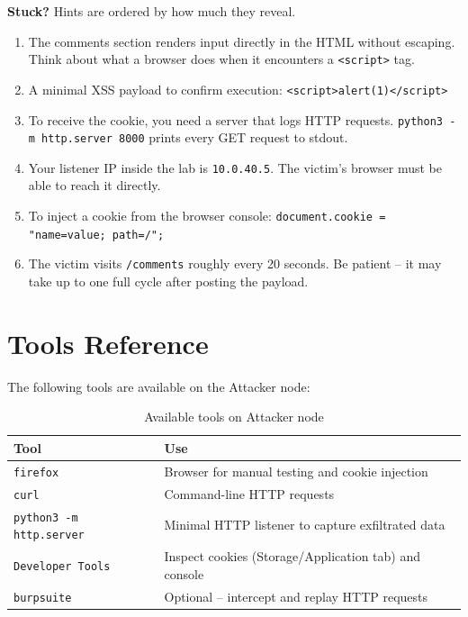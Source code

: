 \documentclass[a4paper, 12pt]{article}
\begin{document}
\begin{mdframed}[backgroundcolor=labgray, linecolor=labred, linewidth=0.5pt]
\textbf{Stuck?} Hints are ordered by how much they reveal.
\begin{enumerate}[leftmargin=2em, topsep=4pt]
    \item The comments section renders input directly in the HTML without escaping.
          Think about what a browser does when it encounters a \texttt{<script>} tag.
    \item A minimal XSS payload to confirm execution:
          \texttt{<script>alert(1)</script>}
    \item To receive the cookie, you need a server that logs HTTP requests.
          \texttt{python3 -m http.server 8000} prints every GET request to stdout.
    \item Your listener IP inside the lab is \texttt{10.0.40.5}.
          The victim's browser must be able to reach it directly.
    \item To inject a cookie from the browser console:
          \texttt{document.cookie = "name=value; path=/";}
    \item The victim visits \texttt{/comments} roughly every 20 seconds.
          Be patient -- it may take up to one full cycle after posting the payload.
\end{enumerate}
\end{mdframed}

\section{Tools Reference}

The following tools are available on the Attacker node:

\begin{table}[H]
\centering
\begin{tabularx}{0.9\textwidth}{lX}
\toprule
\textbf{Tool}                   & \textbf{Use} \\
\midrule
\texttt{firefox}                & Browser for manual testing and cookie injection \\
\texttt{curl}                   & Command-line HTTP requests \\
\texttt{python3 -m http.server} & Minimal HTTP listener to capture exfiltrated data \\
\texttt{Developer Tools}        & Inspect cookies (Storage/Application tab) and console \\
\texttt{burpsuite}              & Optional -- intercept and replay HTTP requests \\
\bottomrule
\end{tabularx}
\caption{Available tools on Attacker node}
\end{table}
\end{document}
